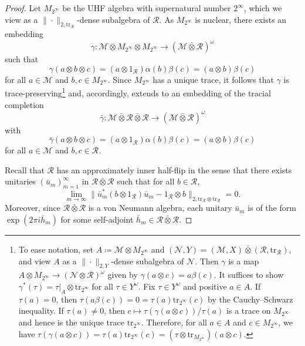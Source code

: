 \documentclass[10pt,a4paper]{amsart}
\newcommand{\M}{\mathcal{M}}
\newcommand{\R}{\mathcal R}
\newcommand{\barotimes}{\bar\otimes}
\newcommand{\tr}{\mathrm{tr}}
\begin{document}
\begin{proof}
Let $M_{2^\infty}$ be the UHF algebra with supernatural number $2^\infty$, which we view as a $\|\cdot\|_{2,\tr_\R}$-dense subalgebra of $\R$.
As $M_{2^\infty}$ is nuclear, there exists an embedding 
\begin{equation}
    \gamma\colon  \M \otimes M_{2^\infty}  \otimes M_{2^\infty}  \longrightarrow (\M \barotimes \R)^\omega
\end{equation}
such that 
\begin{equation}
    \gamma(a \otimes b \otimes c) = (a \otimes 1_\R)\alpha(b)\beta(c)= (a \otimes b)\beta(c)
\end{equation}
for all $a \in \M$ and $b,c \in M_{2^\infty}$.
Since  $M_{2^\infty}$ has a unique trace, it follows that $\gamma$ is trace-preserving\footnote{To ease notation, set $A \coloneqq \mathcal M \otimes  M_{2^\infty}$ and $(\mathcal N, Y) = (\mathcal M, X) \bar\otimes (\mathcal R, \mathrm{tr}_\mathcal R)$, and view $A$ as a $\|\cdot\|_{2, Y}$-dense subalgebra of $\mathcal N$.  Then $\gamma$ is a map $A \otimes M_{2^\infty} \rightarrow (\mathcal N \otimes \mathcal R)^\omega$ given by $\gamma(a \otimes c) = a \beta(c)$.  It suffices to show $\gamma^*(\tau) = \tau|_A \otimes \mathrm{tr}_{2^\infty}$ for all $\tau \in Y^\omega$.  Fix $\tau \in Y^\omega$ and positive $a \in A$.  If $\tau(a) = 0$, then $\tau(a \beta(c)) = 0 = \tau(a) \mathrm{tr}_{2^\infty}(c)$ by the Cauchy--Schwarz inequality.  If $\tau(a) \neq 0$, then $c \mapsto \tau(\gamma(a \otimes c)) / \tau(a)$ is a trace on $M_{2^\infty}$ and hence is the unique trace $\mathrm{tr}_{2^\infty}$.  Therefore, for all $a \in A$ and $c \in M_{2^\infty}$, we have $\tau(\gamma(a \otimes c)) = \tau(a) \mathrm{tr}_{2^\infty}(c) = (\tau \otimes \mathrm{tr}_{M_{2^\infty}})(a\otimes c)$.}
and, accordingly,  extends to an embedding of the tracial completion 
\begin{equation}
    \bar{\gamma}\colon \M \barotimes \R \barotimes \R \longrightarrow (\M \barotimes \R)^\omega
\end{equation}
with 
\begin{equation}
    \bar{\gamma}(a \otimes b \otimes c) = (a \otimes 1_\R)\alpha(b)\beta(c) = (a \otimes b)\beta(c)
\end{equation}
for all  $a \in \M$ and $b,c \in \R$.

Recall that $\R$ has an approximately inner half-flip in the sense that there exists unitaries $(\bar{u}_m)_{m=1}^\infty$ in $\R \barotimes \R$ such that for all $b \in \R$,
\begin{equation}
	\lim_{m\to\infty} \|\bar{u}_m^*(b \otimes 1_\R) \bar{u}_m - 1_\R \otimes b\|_{2, \tr_{\R} \otimes \tr_{\R}} = 0.
\end{equation}
Moreover, since $\R \barotimes \R$ is a von Neumann algebra, each unitary $\bar{u}_m$ is of the form $\exp(2\pi i \bar{h}_m)$ for some self-adjoint $\bar{h}_m \in \R\barotimes\R$.


\end{proof}
\end{document}
